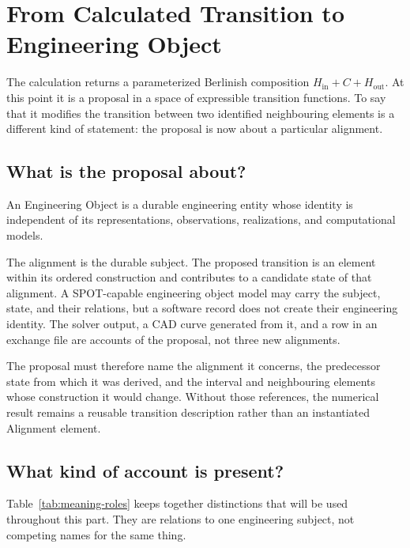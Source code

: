 
\chapter{From Calculated Transition to Engineering Object}
\label{chap:engineering-objects}

The calculation returns a parameterized Berlinish composition
$H_{\mathrm{in}}+C+H_{\mathrm{out}}$. At this point it is a proposal in a
space of expressible transition functions. To say that it modifies the
transition between two identified neighbouring elements is a different kind
of statement: the proposal is now about a particular alignment.

\section{What is the proposal about?}

\begin{definition}
\label{def:engineering-object}
An Engineering Object is a durable engineering entity whose identity is
independent of its representations, observations, realizations, and
computational models.
\end{definition}

The alignment is the durable subject. The proposed transition is an element
within its ordered construction and contributes to a candidate state of that
alignment. A SPOT-capable engineering object model may carry the subject,
state, and their relations, but a software record does not create their
engineering identity. The solver output, a CAD curve generated from it, and a
row in an exchange file are accounts of the proposal, not three new
alignments.

The proposal must therefore name the alignment it concerns, the predecessor
state from which it was derived, and the interval and neighbouring elements
whose construction it would change. Without those references, the numerical
result remains a reusable transition description rather than an instantiated
Alignment element.

\section{What kind of account is present?}

Table~\ref{tab:meaning-roles} keeps together distinctions that will be used
throughout this part. They are relations to one engineering subject, not
competing names for the same thing.

